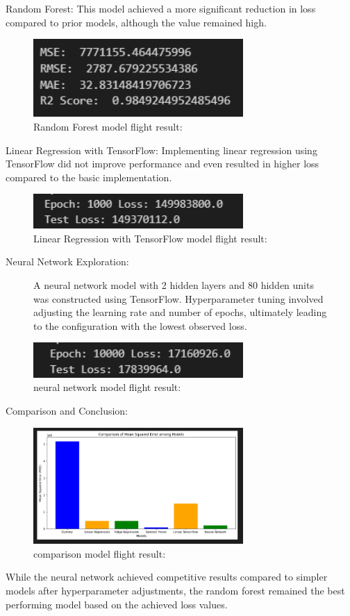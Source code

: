 \documentclass{article}
\begin{document}
Random Forest: This model achieved a more significant reduction in loss compared to prior models, although the value remained high.
\begin{figure}[H]
    \caption{Random Forest model flight result:}
    \centering
    \includegraphics[width=8cm]{imgFolder/randomForestFlight.png}
\end{figure}

Linear Regression with TensorFlow: Implementing linear regression using TensorFlow did not improve performance and even resulted in higher loss compared to the basic implementation.
\begin{figure}[H]
    \caption{Linear Regression with TensorFlow model flight result:}
    \centering
    \includegraphics[width=8cm]{imgFolder/linearRegressionTensorflowFlight.png}
\end{figure}

Neural Network Exploration:

\begin{figure}[H]
    A neural network model with 2 hidden layers and 80 hidden units was constructed using TensorFlow. Hyperparameter tuning involved adjusting the learning rate and number of epochs, ultimately leading to the configuration with the lowest observed loss.
    \caption{neural network model flight result:}
    \centering
    \includegraphics[width=8cm]{imgFolder/neuronNetworkFlight.png}
\end{figure}

Comparison and Conclusion:
\begin{figure}[H]
    \caption{comparison model flight result:}
    \centering
    \includegraphics[width=8cm]{imgFolder/comparisonFlight.png}
\end{figure}
While the neural network achieved competitive results compared to simpler models after hyperparameter adjustments, the random forest remained the best performing model based on the achieved loss values.
\end{document}
